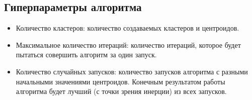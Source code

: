\subsection{Гиперпараметры алгоритма}

\begin{itemize}
\item Количество кластеров: количество создаваемых кластеров и центроидов.
\item Максимальное количество итераций: количество итераций, которое будет пытаться совершить алгоритм за один запуск.
\item Количество случайных запусков: количество запусков алгоритма с разными начальными значениями центроидов. Конечным результатом работы алгоритма будет лучший (с точки зрения инерции) из всех запусков.
\end{itemize}